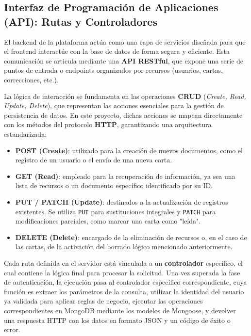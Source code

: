 \subsection{Interfaz de Programación de Aplicaciones (API): Rutas y Controladores}

El backend de la plataforma actúa como una capa de servicios diseñada para que el frontend interactúe con la base de datos de forma segura y eficiente. Esta comunicación se articula mediante una \textbf{API RESTful}, que expone una serie de puntos de entrada o endpoints organizados por recursos (usuarios, cartas, correcciones, etc.).

La lógica de interacción se fundamenta en las operaciones \textbf{CRUD} (\textit{Create, Read, Update, Delete}), que representan las acciones esenciales para la gestión de persistencia de datos. En este proyecto, dichas acciones se mapean directamente con los métodos del protocolo \textbf{HTTP}, garantizando una arquitectura estandarizada:

\begin{itemize}
    \item \textbf{POST (Create)}: utilizado para la creación de nuevos documentos, como el registro de un usuario o el envío de una nueva carta.
    \item \textbf{GET (Read)}: empleado para la recuperación de información, ya sea una lista de recursos o un documento específico identificado por su ID.
    \item \textbf{PUT / PATCH (Update)}: destinados a la actualización de registros existentes. Se utiliza \texttt{PUT} para sustituciones integrales y \texttt{PATCH} para modificaciones parciales, como marcar una carta como "leída".
    \item \textbf{DELETE (Delete)}: encargado de la eliminación de recursos o, en el caso de las cartas, de la activación del borrado lógico mencionado anteriormente.
\end{itemize}

Cada ruta definida en el servidor está vinculada a un \textbf{controlador} específico, el cual contiene la lógica final para procesar la solicitud. Una vez superada la fase de autenticación, la ejecución pasa al controlador específico correspondiente, cuya función es extraer los parámetros de la consulta, utilizar la identidad del usuario ya validada para aplicar reglas de negocio, ejecutar las operaciones correspondientes en MongoDB mediante los modelos de Mongoose, y devolver una respuesta HTTP con los datos en formato JSON y un código de éxito o error.

